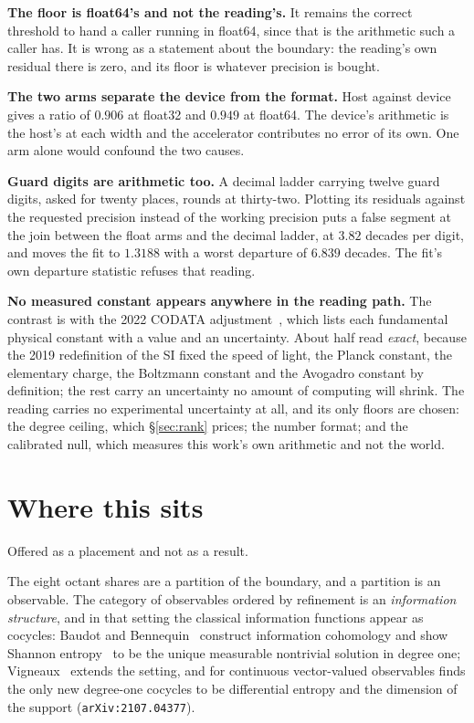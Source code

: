 \textbf{The floor is float64's and not the reading's.} It remains the correct threshold to hand a caller running in float64, since that is the arithmetic such a caller has. It is wrong as a statement about the boundary: the reading's own residual there is zero, and its floor is whatever precision is bought.

\textbf{The two arms separate the device from the format.} Host against device gives a ratio of \(0.906\) at float32 and \(0.949\) at float64. The device's arithmetic is the host's at each width and the accelerator contributes no error of its own. One arm alone would confound the two causes.

\textbf{Guard digits are arithmetic too.} A decimal ladder carrying twelve guard digits, asked for twenty places, rounds at thirty-two. Plotting its residuals against the requested precision instead of the working precision puts a false segment at the join between the float arms and the decimal ladder, at \(3.82\) decades per digit, and moves the fit to \(1.3188\) with a worst departure of \(6.839\) decades. The fit's own departure statistic refuses that reading.

\textbf{No measured constant appears anywhere in the reading path.} The contrast is with the 2022 CODATA adjustment~\cite{src:Mohr-et-al-2025}, which lists each fundamental physical constant with a value and an uncertainty. About half read \emph{exact}, because the 2019 redefinition of the SI fixed the speed of light, the Planck constant, the elementary charge, the Boltzmann constant and the Avogadro constant by definition; the rest carry an uncertainty no amount of computing will shrink. The reading carries no experimental uncertainty at all, and its only floors are chosen: the degree ceiling, which \S\ref{sec:rank} prices; the number format; and the calibrated null, which measures this work's own arithmetic and not the world.

\section{Where this sits}

Offered as a placement and not as a result.

The eight octant shares are a partition of the boundary, and a partition is an observable. The category of observables ordered by refinement is an \emph{information structure}, and in that setting the classical information functions appear as cocycles: Baudot and Bennequin~\cite{src:Baudot} construct information cohomology and show Shannon entropy~\cite{src:Shannon} to be the unique measurable nontrivial solution in degree one; Vigneaux~\cite{src:Vigneaux} extends the setting, and for continuous vector-valued observables finds the only new degree-one cocycles to be differential entropy and the dimension of the support (\texttt{arXiv:2107.04377}).


